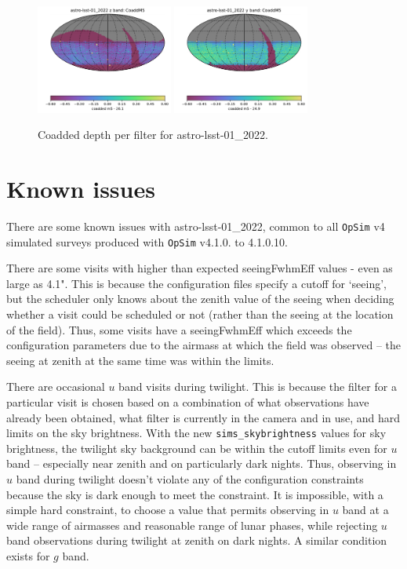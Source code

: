 \documentclass[DM,lsstdraft,authoryear,toc]{lsstdoc}
\newcommand{\opsim}{\texttt{OpSim}\xspace}
\newcommand{\simsky}{\texttt{sims\_skybrightness}\xspace}
\begin{document}
\begin{figure}[ht]
\includegraphics[width=0.4\textwidth]{figures/astro-lsst-01_2022_CoaddM5_z_band_HEAL_SkyMap}
\includegraphics[width=0.4\textwidth]{figures/astro-lsst-01_2022_CoaddM5_y_band_HEAL_SkyMap}
\caption{Coadded depth per filter for astro-lsst-01\_2022.
\label{fig:baseline_coadd}}
\end{figure}


\section{Known issues}

There are some known issues with astro-lsst-01\_2022, common to all \opsim v4 simulated surveys produced with \opsim v4.1.0. to 4.1.0.10.

There are some visits with higher than expected seeingFwhmEff values - even as large as 4.1". This is because the configuration files specify a cutoff for `seeing', but the scheduler only knows about the zenith value of the seeing when deciding whether a visit could be scheduled or not (rather than the seeing at the location of the field). Thus, some visits have a seeingFwhmEff which exceeds the configuration parameters due to the airmass at which the field was observed -- the seeing at zenith at the same time was within the limits.

There are occasional $u$ band visits during twilight. This is because the filter for a particular visit is chosen based on a combination of what observations have already been obtained, what filter is currently in the camera and in use, and hard limits on the sky brightness. With the new \simsky values for sky brightness, the twilight sky background can be within the cutoff limits even for $u$ band -- especially near zenith and on particularly dark nights. Thus, observing in $u$ band during twilight doesn't violate any of the configuration constraints because the sky is dark enough to meet the constraint. It is impossible, with a simple hard constraint, to choose a value that permits observing in $u$ band at a wide range of airmasses and reasonable range of lunar phases, while rejecting $u$ band observations during twilight at zenith on dark nights. A similar condition exists for $g$ band.
\end{document}
